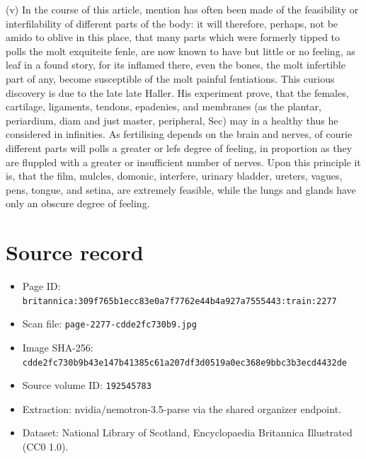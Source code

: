 \documentclass{article}
\begin{document}
(v) In the course of this article, mention has often been made of the feasibility or interfilability of different parts of the body: it will therefore, perhaps, not be amido to oblive in this place, that many parts which were formerly tipped to polls the molt exquiteite fenle, are now known to have but little or no feeling, as leaf in a found story, for its inflamed there, even the bones, the molt infertible part of any, become susceptible of the molt painful fentiations. This curious discovery is due to the late late Haller. His experiment prove, that the females, cartilage, ligaments, tendons, epadenies, and membranes (as the plantar, periardium, diam and just master, peripheral, Sec) may in a healthy thus he considered in infinities. As fertilising depends on the brain and nerves, of courie different parts will polls a greater or lefs degree of feeling, in proportion as they are fluppled with a greater or insufficient number of nerves. Upon this principle it is, that the film, mulcles, domonic, interfere, urinary bladder, ureters, vagues, pens, tongue, and setina, are extremely feasible, while the lungs and glands have only an obscure degree of feeling.

\section*{Source record}
\begin{itemize}
\item Page ID: \texttt{britannica:309f765b1ecc83e0a7f7762e44b4a927a7555443:train:2277}
\item Scan file: \texttt{page-2277-cdde2fc730b9.jpg}
\item Image SHA-256: \texttt{cdde2fc730b9b43e147b41385c61a207df3d0519a0ec368e9bbc3b3ecd4432de}
\item Source volume ID: \texttt{192545783}
\item Extraction: nvidia/nemotron-3.5-parse via the shared organizer endpoint.
\item Dataset: National Library of Scotland, Encyclopaedia Britannica Illustrated (CC0 1.0).
\end{itemize}
\end{document}
